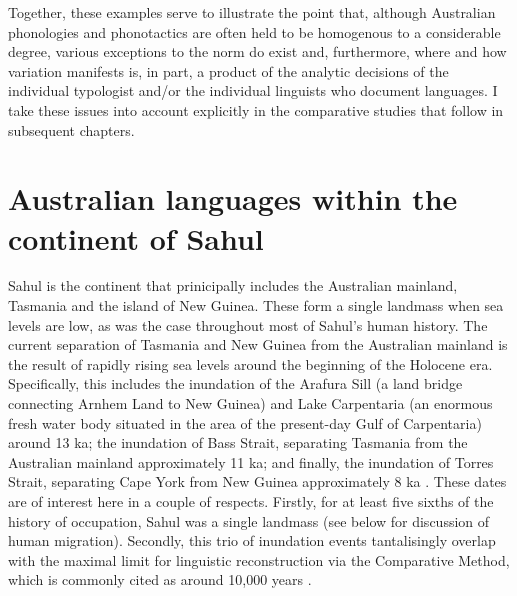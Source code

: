 Together, these examples serve to illustrate the point that, although Australian phonologies and phonotactics are often held to be homogenous to a considerable degree, various exceptions to the norm do exist and, furthermore, where and how variation manifests is, in part, a product of the analytic decisions of the individual typologist and/or the individual linguists who document languages. I take these issues into account explicitly in the comparative studies that follow in subsequent chapters.

\hypertarget{sahul-context}{%
\section{Australian languages within the continent of Sahul}\label{sahul-context}}

Sahul is the continent that prinicipally includes the Australian mainland, Tasmania and the island of New Guinea. These form a single landmass when sea levels are low, as was the case throughout most of Sahul's human history. The current separation of Tasmania and New Guinea from the Australian mainland is the result of rapidly rising sea levels around the beginning of the Holocene era. Specifically, this includes the inundation of the Arafura Sill (a land bridge connecting Arnhem Land to New Guinea) and Lake Carpentaria (an enormous fresh water body situated in the area of the present-day Gulf of Carpentaria) around 13 ka; the inundation of Bass Strait, separating Tasmania from the Australian mainland approximately 11 ka; and finally, the inundation of Torres Strait, separating Cape York from New Guinea approximately 8 ka \autocites{reeves_sedimentary_2008}{williams_sea-level_2018}. These dates are of interest here in a couple of respects. Firstly, for at least five sixths of the history of occupation, Sahul was a single landmass (see below for discussion of human migration). Secondly, this trio of inundation events tantalisingly overlap with the maximal limit for linguistic reconstruction via the Comparative Method, which is commonly cited as around 10,000 years \autocite[p.~135]{nichols_sprung_1997}.


